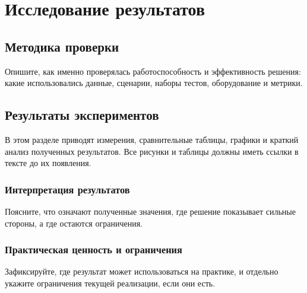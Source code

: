 \chapter{Исследование результатов}\label{ch:results}

\section{Методика проверки}\label{sec:results-method}

Опишите, как именно проверялась работоспособность и эффективность решения:
какие использовались данные, сценарии, наборы тестов, оборудование и метрики.

\section{Результаты экспериментов}\label{sec:results-experiments}

В этом разделе приводят измерения, сравнительные таблицы, графики и краткий
анализ полученных результатов. Все рисунки и таблицы должны иметь ссылки в
тексте до их появления.

\subsection{Интерпретация результатов}\label{subsec:results-interpretation}

Поясните, что означают полученные значения, где решение показывает сильные
стороны, а где остаются ограничения.

\subsection{Практическая ценность и ограничения}\label{subsec:results-limits}

Зафиксируйте, где результат может использоваться на практике, и отдельно
укажите ограничения текущей реализации, если они есть.
